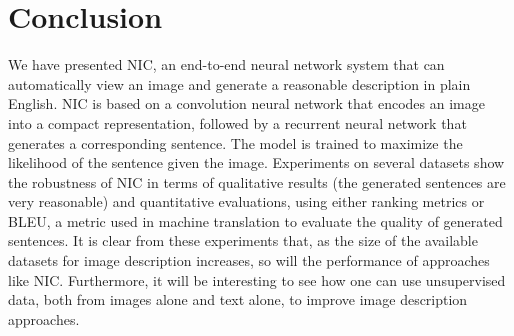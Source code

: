 \section{Conclusion}
\label{sec:conclusion}
We have presented NIC, an
end-to-end neural network system that can automatically view an image
and generate a reasonable description in plain English.
NIC is based on a convolution neural network that encodes an image into
a compact representation, followed by a recurrent neural network that
generates a corresponding sentence. The model is trained to maximize
the likelihood of the sentence given the image.
Experiments on several datasets
show the robustness of NIC in terms of qualitative results (the
generated sentences are very reasonable) and quantitative evaluations,
using either ranking metrics or BLEU, a metric used in machine translation
to evaluate the quality of generated sentences.
It is clear from these experiments that, as the size of the available
datasets for image description increases, so will the performance of
approaches like NIC.
Furthermore, it will be interesting to see how one can use unsupervised
data, both from images alone and text alone, to improve image description
approaches.
